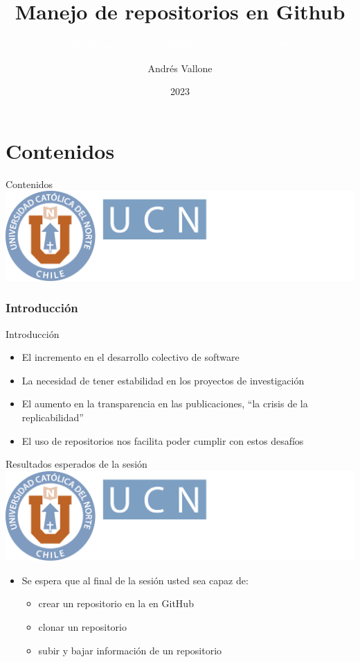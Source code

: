 \documentclass[12pt,a4paper,usenames,x11names,compress]{beamer}
\author[A. Vallone]{{\Large Andr\'{e}s Vallone} \inst{1}}
\institute{\inst{1}{\normalsize Escuela de Ciencias Empresariales}}
\title{\textcolor{DarkOrange1}{Manejo de repositorios en Github}}
\subtitle{\textcolor{white}{Taller de desarrollo de habilidades de investigaci\'{o}n\hfill 2023}}
\date{2023}
\begin{document}
{
\begin{frame}
\titlepage
\end{frame}
}

\part{Contenidos}


\begin{frame}{Contenidos \hfill \includegraphics[scale=.1]{eciem.png}}
\tableofcontents[hideallsubsections]
\end{frame}
\section{Introducción}
\begin{frame}{Introducción}
\begin{itemize}
\justifying
\item El incremento en el desarrollo colectivo de software
\item La necesidad de tener estabilidad en los proyectos de investigación 
\item El aumento en la transparencia en las publicaciones, ``la crisis de la replicabilidad''
\item El uso de repositorios nos facilita poder cumplir con estos desafíos
\end{itemize}
\end{frame}

\begin{frame}{Resultados esperados de la sesión\hfill \includegraphics[scale=.1]{eciem.png}}
\begin{itemize}
\item Se espera que al final de la sesión usted sea capaz de:
\begin{itemize}
\justifying
\item crear un repositorio en la en GitHub
\item clonar un repositorio 
\item subir y bajar información de un repositorio
\end{itemize} 
\end{itemize}
\end{frame}
\end{document}
